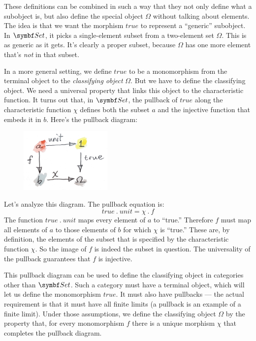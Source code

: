 \noindent
These definitions can be combined in such a way that they not only
define what a subobject is, but also define the special object
$\Omega$ without talking about elements. The idea is that we want the
morphism $\mathit{true}$ to represent a ``generic'' subobject. In
$\Set$, it picks a single-element subset from a two-element set
$\Omega$. This is as generic as it gets. It's clearly a proper subset,
because $\Omega$ has one more element that's \emph{not} in that
subset.

In a more general setting, we define $\mathit{true}$ to be a monomorphism
from the terminal object to the \emph{classifying object} $\Omega$.
But we have to define the classifying object. We need a universal
property that links this object to the characteristic function. It turns
out that, in $\Set$, the pullback of $\mathit{true}$ along the
characteristic function $\chi$ defines both the subset $a$
and the injective function that embeds it in $b$. Here's the
pullback diagram:

\begin{figure}[H]
  \centering
  \includegraphics[width=0.4\textwidth]{images/pullback.jpg}
\end{figure}

\noindent
Let's analyze this diagram. The pullback equation is:
\[\mathit{true}\ .\ \mathit{unit} = \chi\ .\ f\]
The function $\mathit{true}\ .\ \mathit{unit}$ maps every element of $a$ to
``true.'' Therefore $f$ must map all elements of $a$ to
those elements of $b$ for which $\chi$ is ``true.'' These
are, by definition, the elements of the subset that is specified by the
characteristic function $\chi$. So the image of $f$ is indeed
the subset in question. The universality of the pullback guarantees that
$f$ is injective.

This pullback diagram can be used to define the classifying object in
categories other than $\Set$. Such a category must have a terminal
object, which will let us define the monomorphism $\mathit{true}$. It must
also have pullbacks --- the actual requirement is that it must have all
finite limits (a pullback is an example of a finite limit). Under those
assumptions, we define the classifying object $\Omega$ by the property
that, for every monomorphism $f$ there is a unique morphism
$\chi$ that completes the pullback diagram.

